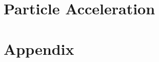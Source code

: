 \documentclass[letterpaper, 11pt, notitlepage]{report}
\begin{document}
\newpage

\tableofcontents\label{sec:contents}

%
%
%
%
%
%
%

\chapter{Particle Acceleration}



\newpage

%
%
%
%
%

\appendix

\newpage
\chapter{Appendix}
%
%
%
%
%
\newpage



\end{document}
